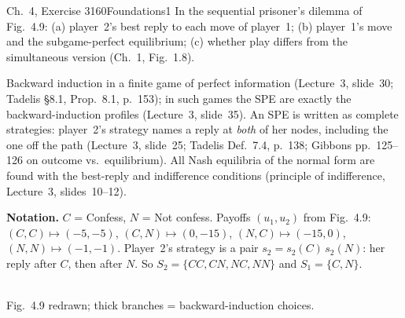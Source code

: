 \begin{exsol}{\MG{} Ch.~4, Exercise 3}{160}{Foundations}{1}
\asked In the sequential prisoner's dilemma of Fig.~4.9: (a) player~2's best reply to each
move of player~1; (b) player~1's move and the subgame-perfect equilibrium; (c) whether play
differs from the simultaneous version (Ch.~1, Fig.~1.8).

\method Backward induction in a finite game of perfect information (Lecture~3, slide~30;
Tadelis \S8.1, Prop.~8.1, p.~153); in such games the SPE are exactly the backward-induction
profiles (Lecture~3, slide~35). An SPE is written as complete strategies: player~2's strategy
names a reply at \emph{both} of her nodes, including the one off the path (Lecture~3, slide~25;
Tadelis Def.~7.4, p.~138; Gibbons pp.~125--126 on outcome vs.\ equilibrium). All Nash equilibria
of the normal form are found with the best-reply and indifference conditions (principle of
indifference, Lecture~3, slides~10--12).

\solution
\textbf{Notation.} $C$ = Confess, $N$ = Not confess. Payoffs $(u_1,u_2)$ from Fig.~4.9:
$(C,C)\mapsto(-5,-5)$, $(C,N)\mapsto(0,-15)$, $(N,C)\mapsto(-15,0)$, $(N,N)\mapsto(-1,-1)$.
Player~2's strategy is a pair $s_2 = s_2(C)\,s_2(N)$: her reply after $C$, then after $N$. So
$S_2 = \{CC, CN, NC, NN\}$ and $S_1 = \{C, N\}$.
\begin{center}
\\[2pt]
{\footnotesize Fig.~4.9 redrawn; thick branches = backward-induction choices.}
\end{center}


\end{exsol}
